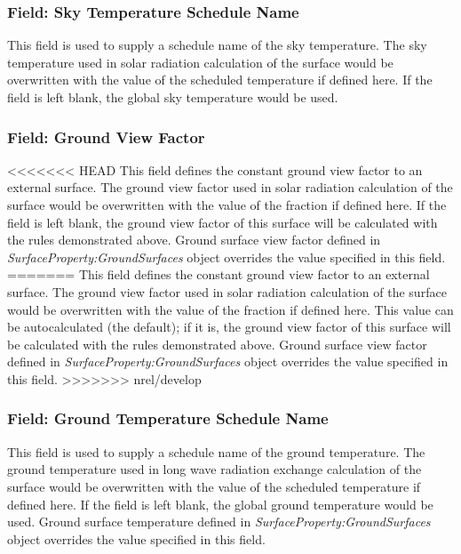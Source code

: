 \subsubsection{Field: Sky Temperature Schedule Name}\label{field-sky-temperature-schedule-name}

This field is used to supply a schedule name of the sky temperature. The sky temperature used in solar radiation calculation of the surface would be overwritten with the value of the scheduled temperature if defined here. If the field is left blank, the global sky temperature would be used.

\subsubsection{Field: Ground View Factor}\label{field-ground-view-factor}

<<<<<<< HEAD
This field defines the constant ground view factor to an external surface. The ground view factor used in solar radiation calculation of the surface would be overwritten with the value of the fraction if defined here. If the field is left blank, the ground view factor of this surface will be calculated with the rules demonstrated above. Ground surface view factor defined in \textit{SurfaceProperty:GroundSurfaces} object overrides the value specified in this field.
=======
This field defines the constant ground view factor to an external surface. The ground view factor used in solar radiation calculation of the surface would be overwritten with the value of the fraction if defined here. This value can be autocalculated (the default); if it is, the ground view factor of this surface will be calculated with the rules demonstrated above. Ground surface view factor defined in \textit{SurfaceProperty:GroundSurfaces} object overrides the value specified in this field.
>>>>>>> nrel/develop

\subsubsection{Field: Ground Temperature Schedule Name}\label{field-ground-temperature-schedule-name}

This field is used to supply a schedule name of the ground temperature. The ground temperature used in long wave radiation exchange calculation of the surface would be overwritten with the value of the scheduled temperature if defined here. If the field is left blank, the global ground temperature would be used. Ground surface temperature defined in \textit{SurfaceProperty:GroundSurfaces} object overrides the value specified in this field.

